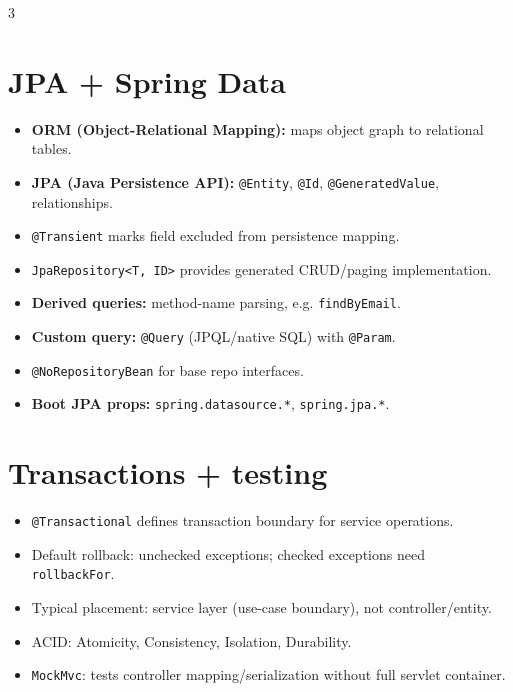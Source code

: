 \begin{multicols}{3}
\columnbreak

\section*{JPA + Spring Data}
\begin{itemize}[leftmargin=*, nosep, topsep=0pt]
  \item \textbf{ORM (\textbf{O}bject-\textbf{R}elational \textbf{M}apping):} maps object graph to relational tables.
  \item \textbf{JPA (\textbf{J}ava \textbf{P}ersistence \textbf{A}PI):} \texttt{@Entity}, \texttt{@Id}, \texttt{@GeneratedValue}, relationships.
  \item \texttt{@Transient} marks field excluded from persistence mapping.
  \item \texttt{JpaRepository<T, ID>} provides generated CRUD/paging implementation.
  \item \textbf{Derived queries:} method-name parsing, e.g. \texttt{findByEmail}.
  \item \textbf{Custom query:} \texttt{@Query} (JPQL/native SQL) with \texttt{@Param}.
  \item \texttt{@NoRepositoryBean} for base repo interfaces.
  \item \textbf{Boot JPA props:} \texttt{spring.datasource.*}, \texttt{spring.jpa.*}.
\end{itemize}

\section*{Transactions + testing}
\begin{itemize}[leftmargin=*, nosep, topsep=0pt]
  \item \texttt{@Transactional} defines transaction boundary for service operations.
  \item Default rollback: unchecked exceptions; checked exceptions need \texttt{rollbackFor}.
  \item Typical placement: service layer (use-case boundary), not controller/entity.
  \item ACID: Atomicity, Consistency, Isolation, Durability.
  \item \texttt{MockMvc}: tests controller mapping/serialization without full servlet container.
\end{itemize}

\end{multicols}
\vspace{0.25ex}
\newpage
